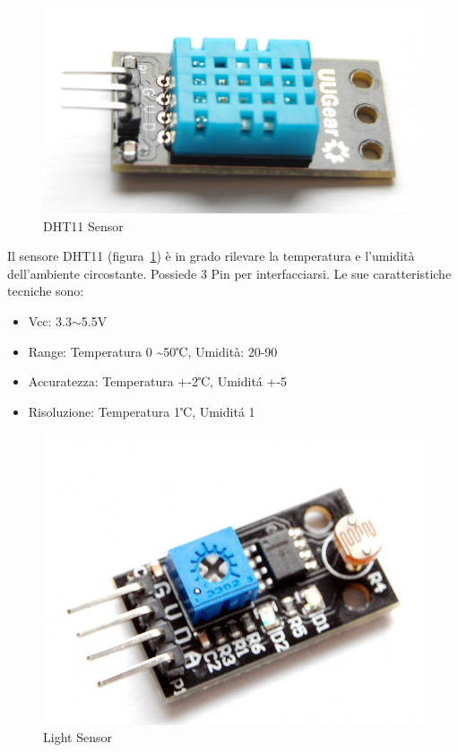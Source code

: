 \newpage

\begin{figure}
\centering
\includegraphics[width=0.7\linewidth]{Figures/Sensors&Rasp/dht11}
\caption[dht11]{DHT11 Sensor}
\label{fig:dht11}
\end{figure}

 Il sensore DHT11 (figura~\ref{fig:dht11}) è in grado rilevare la temperatura e l'umidità dell'ambiente circostante. Possiede 3 Pin per interfacciarsi.
 Le sue caratteristiche tecniche sono:
 
 \begin{itemize}
 	\item Vcc: 3.3$\sim$5.5V
 	\item Range: Temperatura 0 \textasciitilde 50℃, Umidità:  20-90%
 	\item Accuratezza: Temperatura +-2℃, Umidit\'a +-5%
 	\item Risoluzione: Temperatura  1℃, Umidit\'a  1%
 \end{itemize}
 
 \newpage
 
\begin{figure}
	\centering
	\includegraphics[width=0.7\linewidth]{Figures/Sensors&Rasp/light}
	\caption[light]{Light Sensor}
	\label{fig:light}

\end{figure}


